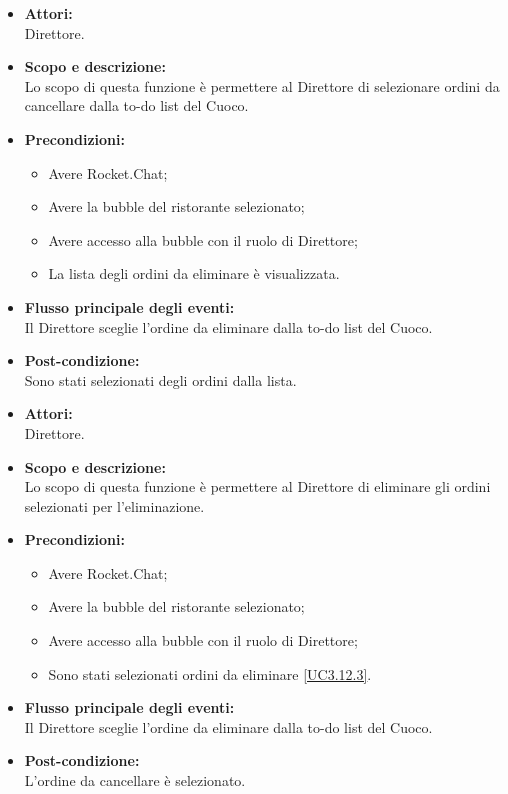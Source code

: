 
\begin{itemize}
	\item \textbf{Attori:}
	\\Direttore.
	\item \textbf{Scopo e descrizione:} 
	\\Lo scopo di questa funzione è permettere al Direttore di selezionare ordini da cancellare dalla to-do list del Cuoco.
	\item \textbf{Precondizioni:}
	\begin{itemize}
		\item Avere Rocket.Chat;
		\item Avere la bubble del ristorante selezionato;
		\item Avere accesso alla bubble con il ruolo di Direttore;
		\item La lista degli ordini da eliminare è visualizzata.
	\end{itemize}
	\item \textbf{Flusso principale degli eventi:}
	\\Il Direttore sceglie l'ordine da eliminare dalla to-do list del Cuoco.
	\item \textbf{Post-condizione:}
	\\Sono stati selezionati degli ordini dalla lista.
\end{itemize}


\begin{itemize}
	\item \textbf{Attori:}
	\\Direttore.
	\item \textbf{Scopo e descrizione:} 
	\\Lo scopo di questa funzione è permettere al Direttore di eliminare gli ordini selezionati per l'eliminazione.
	\item \textbf{Precondizioni:}
	\begin{itemize}
		\item Avere Rocket.Chat;
		\item Avere la bubble del ristorante selezionato;
		\item Avere accesso alla bubble con il ruolo di Direttore;
		\item Sono stati selezionati ordini da eliminare \ref{UC3.12.3}.
	\end{itemize}
	\item \textbf{Flusso principale degli eventi:}
	\\Il Direttore sceglie l'ordine da eliminare dalla to-do list del Cuoco.
	\item \textbf{Post-condizione:}
	\\L'ordine da cancellare è selezionato.
\end{itemize}

